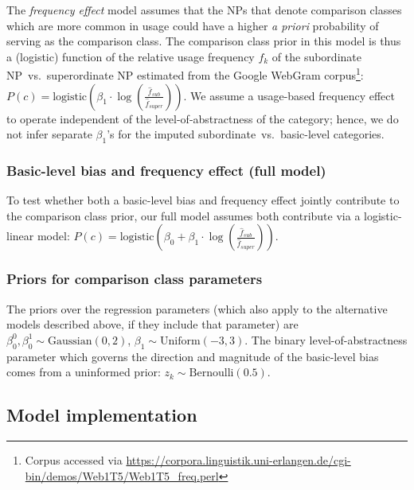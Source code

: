\documentclass[doc]{apa6}
\begin{document}
The \emph{frequency effect} model assumes that the NPs that denote comparison classes which are more common in usage could have a higher \emph{a priori} probability of serving as the comparison class. 
The comparison class prior in this model is thus a (logistic) function of the relative usage frequency $f_k$ of the subordinate NP~vs.~superordinate NP estimated from the Google WebGram corpus\footnote{Corpus accessed via
\url{https://corpora.linguistik.uni-erlangen.de/cgi-bin/demos/Web1T5/Web1T5_freq.perl}}: $P(c) = \text{logistic}(\beta_1\cdot \log (\frac{\hat{f}_{sub}}{\hat{f}_{super}}))$.
We assume a usage-based frequency effect to operate independent of the level-of-abstractness of the category; hence, we do not infer separate $\beta_1$'s for the imputed subordinate~vs.~basic-level categories. 


\subsubsection{Basic-level bias and frequency effect (full model)}

To test whether both a basic-level bias and frequency effect jointly contribute to the comparison class prior, our full model assumes both contribute via a logistic-linear model: $P(c) = \text{logistic}(\beta_0 + \beta_1\cdot \log (\frac{\hat{f}_{sub}}{\hat{f}_{super}}))$.

\subsubsection{Priors for comparison class parameters}

The priors over the regression parameters (which also apply to the alternative models described above, if they include that parameter) are $\beta^0_0 , \beta^1_0\sim \text{Gaussian}(0, 2)$, $\beta_1 \sim \text{Uniform}(-3, 3)$. 
The binary level-of-abstractness parameter which governs the direction and magnitude of the basic-level bias comes from a uninformed prior: $z_{k} \sim \text{Bernoulli}(0.5)$. 



\subsection{Model implementation}
\end{document}
